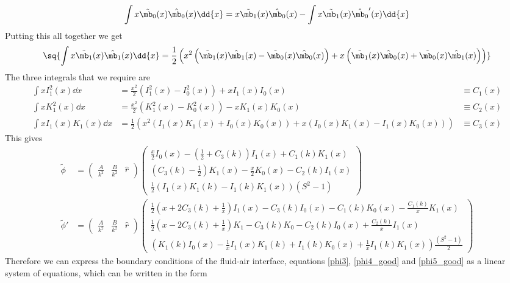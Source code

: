 \documentclass[12pt]{article}
\begin{document}
\begin{align}
\int{x\tilde{\mb_0}(x) \hat{\mb_0}(x)\dd{x}}=x\tilde{\mb_1}(x) \hat{\mb_0}(x)-\int{x\tilde{\mb_1}(x) \hat{\mb_0}'(x)\dd{x}}
\end{align}
Putting this all together we get
\footnotesize
\begin{align}
\sq{\int{x\tilde{\mb_1}(x) \hat{\mb_1}(x)\dd{x}}=\frac{1}{2}\left(x^2\left(\tilde{\mb_1}(x) \hat{\mb_1}(x)-\tilde{\mb_0}(x) \hat{\mb_0}(x)\right)+x\left(\tilde{\mb_1}(x) \hat{\mb_0}(x)+\tilde{\mb_0}(x) \hat{\mb_1}(x)\right)\right)}
\end{align}
\normalsize
The three integrals that we require are
\footnotesize
\begin{align}
\int{xI_1^2(x)\dd{x}}&=\frac{x^2}{2}\left(I_1^2(x)-I_0^2(x)\right)+ xI_1(x)I_0(x)& \equiv C_1(x)\\
\int{xK_1^2(x)\dd{x}}&=\frac{x^2}{2}\left(K_1^2(x)-K_0^2(x)\right) - xK_1(x)K_0(x)& \equiv C_2(x)\\
\int{xI_1(x)K_1(x)\dd{x}}&=\frac{1}{2}\left(x^2(I_1(x)K_1(x)+I_0(x)K_0(x))+x(I_0(x)K_1(x)-I_1(x)K_0(x))\right)&\equiv C_3(x)
\end{align}
\normalsize
This gives
\footnotesize
\begin{align}
\tilde\phi&=\begin{pmatrix}\frac{A}{k^2}& \frac{B}{k^2} & \hat r\end{pmatrix}\begin{pmatrix}\frac{x}{2}I_0(x)-\left(\frac{1}{2}+C_3(k)\right)I_1(x)+C_1(k)K_1(x)\\\left(C_3(k)-\frac{1}{2}\right)K_1(x)-\frac{x}{2}K_0(x)-C_2(k)I_1(x)\\\frac{1}{2}(I_1(x)K_1(k)-I_1(k)K_1(x))(S^2-1)\end{pmatrix}\\
\tilde\phi'&=\begin{pmatrix}\frac{A}{k^2}& \frac{B}{k^2} & \hat r\end{pmatrix}\begin{pmatrix}\frac{1}{2}\left(x+2C_3(k)+\frac{1}{x}\right)I_1(x)-C_3(k)I_0(x)-C_1(k)K_0(x)-\frac{C_1(k)}{x}K_1(x)\\\frac{1}{2}\left(x-2C_3(k)+\frac{1}{x}\right)K_1-C_3(k)K_0-C_2(k)I_0(x)+\frac{C_2(k)}{x}I_1(x)\\\left(K_1(k)I_0(x)-\frac{1}{x}I_1(x)K_1(k)+I_1(k)K_0(x)+ \frac{1}{x}I_1(k)K_1(x)\right)\frac{(S^2-1)}{2}\end{pmatrix}
\end{align}
\normalsize
Therefore we can express the boundary conditions of the fluid-air interface, equations \eqref{phi3}, \eqref{phi4_good} and \eqref{phi5_good} as a linear system of equations, which can be written in the form
\end{document}
